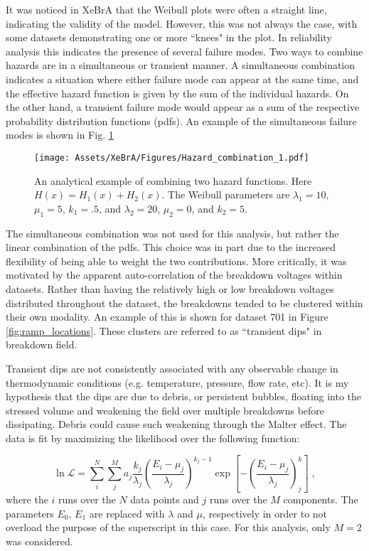 It was noticed in XeBrA that the Weibull plots were often a straight line, indicating the validity of the model.
However, this was not always the case, with some datasets demonstrating one or more ``knees" in the plot.
In reliability analysis this indicates the presence of several failure modes.
Two ways to combine hazards are in a simultaneous or transient manner.
A simultaneous combination indicates a situation where either failure mode can appear at the same time, and the effective hazard function is given by the sum of the individual hazards.
On the other hand, a transient failure mode would appear as a sum of the respective probability distribution functions (pdfs).
An example of the simultaneous failure modes is shown in Fig. \ref{fig:weibull_combination}

\begin{figure}
    \centering
    \texttt{[image: Assets/XeBrA/Figures/Hazard\_combination\_1.pdf]}
    \caption[An analytical example of combining two hazard functions.]%
    {An analytical example of combining two hazard functions.
    Here $H(x) = H_1(x) + H_2(x)$.
    The Weibull parameters are $\lambda_1 = 10$, $\mu_1=5$, $k_1=.5$, and $\lambda_2 = 20$, $\mu_2=0$, and $k_2=5$. }
    \label{fig:weibull_combination}
\end{figure}

The simultaneous combination was not used for this analysis, but rather the linear combination of the pdfs.
This choice was in part due to the increased flexibility of being able to weight the two contributions.
More critically, it was motivated by the apparent auto-correlation of the breakdown voltages within datasets.
Rather than having the relatively high or low breakdown voltages distributed throughout the dataset, the breakdowns tended to be clustered within their own modality.
An example of this is shown for dataset 701 in Figure \ref{fig:ramp_locations}.
These clusters are referred to as ``transient dips" in breakdown field.

Transient dips are not consistently associated with any observable change in thermodynamic conditions (e.g. temperature, pressure, flow rate, etc).
It is my hypothesis that the dips are due to debris, or persistent bubbles, floating into the stressed volume and weakening the field over multiple breakdowns before dissipating.
Debris could cause such weakening through the Malter effect\cite{malter_thin_1936}.
The data is fit by maximizing the likelihood over the following function:

\begin{equation}
    \ln\mathcal{L} = \sum_i^N \sum_j^M a_j  \frac{k_j}{\lambda_j} \left( \frac{E_i-\mu_j}{\lambda_j} \right)^{k_j-1}\exp\left[-\left(\frac{E_i-\mu_j}{\lambda_j}\right)^k_j\right]\;,
\end{equation}
\noindent
where the $i$ runs over the $N$ data points and $j$ runs over the $M$ components.
The parameters $E_0$, $E_1$ are replaced with $\lambda$ and $\mu$, respectively in order to not overload the purpose of the superscript in this case.
For this analysis, only $M=2$ was considered.

